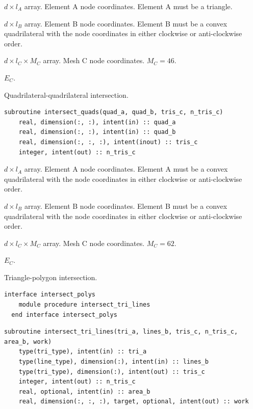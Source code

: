 \documentclass{article}
\begin{document}
\begin{description}[font=\ttfamily\bfseries,leftmargin=2.2\parindent,labelindent=1.7\parindent,noitemsep]
  \item[tri\_a] $d \times l_A$ array. Element A node coordinates. Element A
    must be a triangle.
  \item[quad\_b] $d \times l_B$ array. Element B node coordinates. Element B
    must be a convex quadrilateral with the node coordinates in either clockwise
    or anti-clockwise order.
  \item[tris\_c] $d \times l_C \times M_C$ array. Mesh C node coordinates.
    $M_C = 46$.
  \item[n\_tris\_c] $E_C$.
\end{description}

\noindent Quadrilateral-quadrilateral intersection.

\begin{lstlisting}[language=FORTRAN]
  subroutine intersect_quads(quad_a, quad_b, tris_c, n_tris_c)
    real, dimension(:, :), intent(in) :: quad_a
    real, dimension(:, :), intent(in) :: quad_b
    real, dimension(:, :, :), intent(inout) :: tris_c
    integer, intent(out) :: n_tris_c
\end{lstlisting}

\begin{description}[font=\ttfamily\bfseries,leftmargin=2.2\parindent,labelindent=1.7\parindent,noitemsep]
  \item[quad\_a] $d \times l_A$ array. Element A node coordinates. Element A
    must be a convex quadrilateral with the node coordinates in either clockwise
    or anti-clockwise order.
  \item[quad\_b] $d \times l_B$ array. Element B node coordinates. Element B
    must be a convex quadrilateral with the node coordinates in either clockwise
    or anti-clockwise order.
  \item[tris\_c] $d \times l_C \times M_C$ array. Mesh C node coordinates.
    $M_C = 62$.
  \item[n\_tris\_c] $E_C$.
\end{description}

\noindent Triangle-polygon intersection.
  
\begin{lstlisting}[language=FORTRAN]
  interface intersect_polys
    module procedure intersect_tri_lines
  end interface intersect_polys
\end{lstlisting}

\begin{lstlisting}[language=FORTRAN]
  subroutine intersect_tri_lines(tri_a, lines_b, tris_c, n_tris_c, area_b, work)
    type(tri_type), intent(in) :: tri_a
    type(line_type), dimension(:), intent(in) :: lines_b
    type(tri_type), dimension(:), intent(out) :: tris_c
    integer, intent(out) :: n_tris_c
    real, optional, intent(in) :: area_b
    real, dimension(:, :, :), target, optional, intent(out) :: work
\end{lstlisting}
\end{document}
